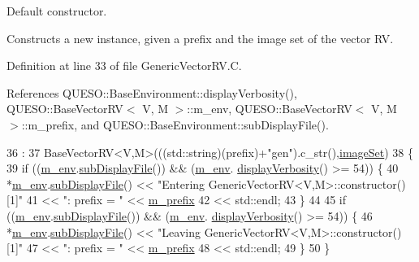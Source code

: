 Default constructor. 

Constructs a new instance, given a prefix and the image set of the vector R\-V. 

Definition at line 33 of file Generic\-Vector\-R\-V.\-C.



References Q\-U\-E\-S\-O\-::\-Base\-Environment\-::display\-Verbosity(), Q\-U\-E\-S\-O\-::\-Base\-Vector\-R\-V$<$ V, M $>$\-::m\-\_\-env, Q\-U\-E\-S\-O\-::\-Base\-Vector\-R\-V$<$ V, M $>$\-::m\-\_\-prefix, and Q\-U\-E\-S\-O\-::\-Base\-Environment\-::sub\-Display\-File().


\begin{DoxyCode}
36   :
37   BaseVectorRV<V,M>(((std::string)(prefix)+\textcolor{stringliteral}{"gen"}).c\_str(),\hyperlink{class_q_u_e_s_o_1_1_base_vector_r_v_aa4dd2f036228eac1f945bacc7147a922}{imageSet})
38 \{
39   \textcolor{keywordflow}{if} ((\hyperlink{class_q_u_e_s_o_1_1_base_vector_r_v_a556761c50e2d171977ef5f19a63c8c73}{m\_env}.\hyperlink{class_q_u_e_s_o_1_1_base_environment_a8a0064746ae8dddfece4229b9ad374d6}{subDisplayFile}()) && (\hyperlink{class_q_u_e_s_o_1_1_base_vector_r_v_a556761c50e2d171977ef5f19a63c8c73}{m\_env}.
      \hyperlink{class_q_u_e_s_o_1_1_base_environment_a1fe5f244fc0316a0ab3e37463f108b96}{displayVerbosity}() >= 54)) \{
40     *\hyperlink{class_q_u_e_s_o_1_1_base_vector_r_v_a556761c50e2d171977ef5f19a63c8c73}{m\_env}.\hyperlink{class_q_u_e_s_o_1_1_base_environment_a8a0064746ae8dddfece4229b9ad374d6}{subDisplayFile}() << \textcolor{stringliteral}{"Entering GenericVectorRV<V,M>::constructor() [1]"}
41                             << \textcolor{stringliteral}{": prefix = "} << \hyperlink{class_q_u_e_s_o_1_1_base_vector_r_v_a030ce3bc9873a9eaf6d8bf452c096ab3}{m\_prefix}
42                             << std::endl;
43   \}
44 
45   \textcolor{keywordflow}{if} ((\hyperlink{class_q_u_e_s_o_1_1_base_vector_r_v_a556761c50e2d171977ef5f19a63c8c73}{m\_env}.\hyperlink{class_q_u_e_s_o_1_1_base_environment_a8a0064746ae8dddfece4229b9ad374d6}{subDisplayFile}()) && (\hyperlink{class_q_u_e_s_o_1_1_base_vector_r_v_a556761c50e2d171977ef5f19a63c8c73}{m\_env}.
      \hyperlink{class_q_u_e_s_o_1_1_base_environment_a1fe5f244fc0316a0ab3e37463f108b96}{displayVerbosity}() >= 54)) \{
46     *\hyperlink{class_q_u_e_s_o_1_1_base_vector_r_v_a556761c50e2d171977ef5f19a63c8c73}{m\_env}.\hyperlink{class_q_u_e_s_o_1_1_base_environment_a8a0064746ae8dddfece4229b9ad374d6}{subDisplayFile}() << \textcolor{stringliteral}{"Leaving GenericVectorRV<V,M>::constructor() [1]"}
47                             << \textcolor{stringliteral}{": prefix = "} << \hyperlink{class_q_u_e_s_o_1_1_base_vector_r_v_a030ce3bc9873a9eaf6d8bf452c096ab3}{m\_prefix}
48                             << std::endl;
49   \}
50 \}
\end{DoxyCode}
